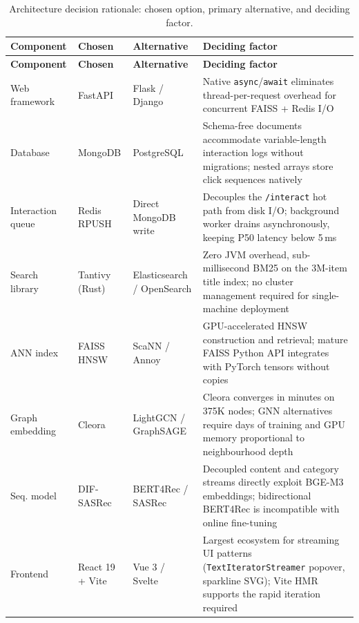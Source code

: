 \begin{longtable}{p{3.2cm} p{2.8cm} p{2.8cm} p{4.2cm}}
\caption{Architecture decision rationale: chosen option, primary alternative, and deciding factor.}
\label{tab:tech_rationale} \\
\hline
\textbf{Component} & \textbf{Chosen} & \textbf{Alternative} & \textbf{Deciding factor} \\
\hline
\endfirsthead
\hline
\textbf{Component} & \textbf{Chosen} & \textbf{Alternative} & \textbf{Deciding factor} \\
\hline
\endhead
\hline
\endfoot
\hline
\endlastfoot
Web framework    & FastAPI       & Flask / Django     & Native \texttt{async}/\texttt{await} eliminates thread-per-request overhead for concurrent FAISS + Redis I/O \\
\hline
Database         & MongoDB       & PostgreSQL         & Schema-free documents accommodate variable-length interaction logs without migrations; nested arrays store click sequences natively \\
\hline
Interaction queue & Redis RPUSH  & Direct MongoDB write & Decouples the \texttt{/interact} hot path from disk I/O; background worker drains asynchronously, keeping P50 latency below 5\,ms \\
\hline
Search library   & Tantivy (Rust) & Elasticsearch / OpenSearch & Zero JVM overhead, sub-millisecond BM25 on the 3M-item title index; no cluster management required for single-machine deployment \\
\hline
ANN index        & FAISS HNSW    & ScaNN / Annoy      & GPU-accelerated HNSW construction and retrieval; mature FAISS Python API integrates with PyTorch tensors without copies \\
\hline
Graph embedding  & Cleora        & LightGCN / GraphSAGE & Cleora converges in minutes on 375K nodes; GNN alternatives require days of training and GPU memory proportional to neighbourhood depth \\
\hline
Seq. model       & DIF-SASRec    & BERT4Rec / SASRec  & Decoupled content and category streams directly exploit BGE-M3 embeddings; bidirectional BERT4Rec is incompatible with online fine-tuning \\
\hline
Frontend         & React 19 + Vite & Vue 3 / Svelte   & Largest ecosystem for streaming UI patterns (\texttt{TextIteratorStreamer} popover, sparkline SVG); Vite HMR supports the rapid iteration required \\
\end{longtable}

